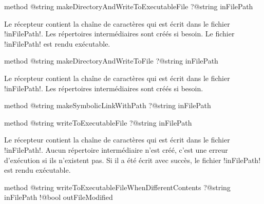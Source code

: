 \begin{galgas3box}
method @string makeDirectoryAndWriteToExecutableFile ?@string inFilePath
\end{galgas3box}

Le récepteur contient la chaîne de caractères qui est écrit dans le fichier \ggst!inFilePath!. Les répertoires intermédiaires sont créés si besoin. Le fichier \ggst!inFilePath! est rendu exécutable.








\begin{galgas3box}
method @string makeDirectoryAndWriteToFile ?@string inFilePath
\end{galgas3box}

Le récepteur contient la chaîne de caractères qui est écrit dans le fichier \ggst!inFilePath!. Les répertoires intermédiaires sont créés si besoin.









\begin{galgas3box}
method @string makeSymbolicLinkWithPath ?@string inFilePath
\end{galgas3box}









\begin{galgas3box}
method @string writeToExecutableFile ?@string inFilePath
\end{galgas3box}

Le récepteur contient la chaîne de caractères qui est écrit dans le fichier \ggst!inFilePath!. Aucun répertoire intermédiaire n'est créé, c'est une erreur d'exécution si ils n'existent pas. Si il a été écrit avec succès, le fichier \ggst!inFilePath! est rendu exécutable.










\begin{galgas3box}
method @string writeToExecutableFileWhenDifferentContents
    ?@string inFilePath
    !@bool outFileModified
\end{galgas3box}

